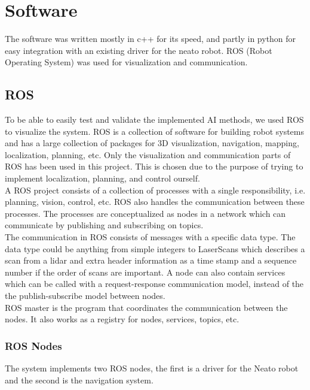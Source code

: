 
\section{Software} 
\label{sec:software}

The software was written mostly in c++ for its speed, and partly in python for easy integration with an existing driver for the neato robot. ROS (Robot Operating System) was used for visualization and communication.

\subsection{ROS}
To be able to easily test and validate the implemented AI methods, we used ROS to visualize the system. ROS  is a collection of software for building robot systems and has a large collection of packages for 3D visualization, navigation, mapping, localization, planning, etc. Only the visualization and communication parts of ROS has been used in this project. This is chosen due to the purpose of trying to implement localization, planning, and control ourself. \\

A ROS project consists of a collection of processes with a single responsibility, i.e. planning, vision, control, etc. ROS also handles the communication between these processes. The processes are conceptualized as nodes in a network which can communicate by publishing and subscribing on topics. \\

The communication in ROS consists of messages with a specific data type. The data type could be anything from simple integers to LaserScans which describes a scan from a lidar and extra header information as a time stamp and a sequence number if the order of scans are important. A node can also contain services which can be called with a request-response communication model, instead of the the publish-subscribe model between nodes.\\

ROS master is the program that coordinates the communication between the nodes. It also works as a registry for nodes, services, topics, etc.

\subsubsection{ROS Nodes}
The system implements two ROS nodes, the first is a driver for the Neato robot and the second is the navigation system.\\

